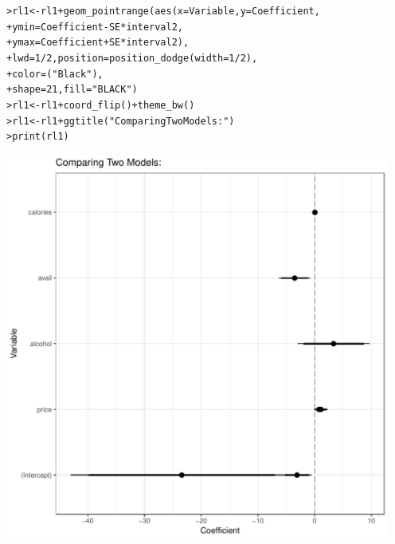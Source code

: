 \documentclass[12pt]{article}\usepackage[]{graphicx}\usepackage[]{color}
\makeatletter
\newcommand{\hlnum}[1]{\textcolor[rgb]{0.82,0.78,0.62}{#1}}%
\newcommand{\hlstr}[1]{\textcolor[rgb]{0.82,0.78,0.62}{#1}}%
\newcommand{\hlopt}[1]{\textcolor[rgb]{0.882,0.878,0.898}{#1}}%
\newcommand{\hlstd}[1]{\textcolor[rgb]{0.882,0.878,0.898}{#1}}%
\newcommand{\hlkwb}[1]{\textcolor[rgb]{0.902,0.675,0.196}{#1}}%
\newcommand{\hlkwc}[1]{\textcolor[rgb]{0.812,0.522,0.388}{#1}}%
\newcommand{\hlkwd}[1]{\textcolor[rgb]{0.733,0.388,0.812}{#1}}%
\newenvironment{kframe}{%
 \def\at@end@of@kframe{}%
 \ifinner\ifhmode%
  \def\at@end@of@kframe{\end{minipage}}%
  \begin{minipage}{\columnwidth}%
 \fi\fi%
 \def\FrameCommand##1{\hskip\@totalleftmargin \hskip-\fboxsep
 \colorbox{shadecolor}{##1}\hskip-\fboxsep
     \hskip-\linewidth \hskip-\@totalleftmargin \hskip\columnwidth}%
 \MakeFramed {\advance\hsize-\width
   \@totalleftmargin\z@ \linewidth\hsize
   \@setminipage}}%
 {\par\unskip\endMakeFramed%
 \at@end@of@kframe}
\newenvironment{knitrout}{}{} %
\makeatother
\begin{document}
\begin{flushleft}
\begin{center}
\begin{knitrout}
\begin{kframe}
\begin{alltt}
\hlstd{> }\hlstd{rl1} \hlkwb{<-} \hlstd{rl1} \hlopt{+} \hlkwd{geom_pointrange}\hlstd{(}\hlkwd{aes}\hlstd{(}\hlkwc{x} \hlstd{= Variable,} \hlkwc{y} \hlstd{= Coefficient,}
\hlstd{+ }\hlkwc{ymin} \hlstd{= Coefficient} \hlopt{-} \hlstd{SE}\hlopt{*}\hlstd{interval2,}
\hlstd{+ }               \hlkwc{ymax} \hlstd{= Coefficient} \hlopt{+} \hlstd{SE}\hlopt{*}\hlstd{interval2),}
\hlstd{+ }               \hlkwc{lwd} \hlstd{=} \hlnum{1}\hlopt{/}\hlnum{2}\hlstd{,} \hlkwc{position} \hlstd{=} \hlkwd{position_dodge}\hlstd{(}\hlkwc{width} \hlstd{=} \hlnum{1}\hlopt{/}\hlnum{2}\hlstd{),}
\hlstd{+ }               \hlkwc{color}\hlstd{=(}\hlstr{"Black"}\hlstd{),}
\hlstd{+ }               \hlkwc{shape} \hlstd{=} \hlnum{21}\hlstd{,} \hlkwc{fill} \hlstd{=} \hlstr{"BLACK"}\hlstd{)}
\hlstd{> }\hlstd{rl1} \hlkwb{<-} \hlstd{rl1} \hlopt{+} \hlkwd{coord_flip}\hlstd{()} \hlopt{+} \hlkwd{theme_bw}\hlstd{()}
\hlstd{> }\hlstd{rl1} \hlkwb{<-} \hlstd{rl1} \hlopt{+} \hlkwd{ggtitle}\hlstd{(}\hlstr{"Comparing Two Models:"}\hlstd{)}
\hlstd{> }\hlkwd{print}\hlstd{(rl1)}
\end{alltt}
\end{kframe}
\includegraphics[width=5in,height=5in]{figure/rope-1} 

\end{knitrout}
\end{center}








\end{flushleft}
\end{document}
